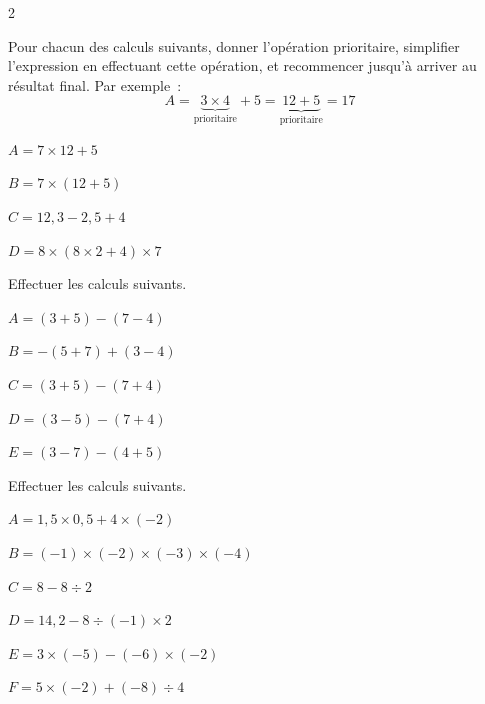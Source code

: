 \begin{multicols}{2}
    \begin{exercice}{}{}
        Pour chacun des calculs suivants, donner l'opération prioritaire, simplifier l'expression en effectuant cette opération, et recommencer jusqu'à arriver au résultat final. Par exemple~:
        $$A = \underbrace{3 \times 4}_\text{prioritaire} + 5 = \underbrace{12 + 5}_\text{prioritaire} = 17$$
        \begin{enumeratebf}
            \item $A=7\times 12+5$
            \item $B=7\times (12+5)$
            \item $C=12,3-2,5+4$
            \item $D=8\times (8\times 2+4)\times 7$
        \end{enumeratebf}
    \end{exercice}



\begin{exercice}{}{}
    Effectuer les calculs suivants.
    \begin{enumeratebf}
        \item $A=(3+5)-(7-4)$
        \item $B=-(5+7)+(3-4)$
        \item $C=(3+5)-(7+4)$
        \item $D=(3-5)-(7+4)$
        \item $E=(3-7)-(4+5)$
    \end{enumeratebf}

\end{exercice}

\begin{exercice}{}{}
    Effectuer les calculs suivants.

    \begin{enumeratebf}
        \item $A=1,5\times 0,5+4\times (-2)$
        \item $B=(-1)\times (-2)\times (-3)\times (-4)$
        \item $C=8-8÷2$
        \item $D=14,2-8÷(-1)\times 2$
        \item $E=3\times (-5)-(-6)\times (-2)$
        \item $F=5\times (-2)+(-8)÷4$
    \end{enumeratebf}



\end{exercice}



\end{multicols}
